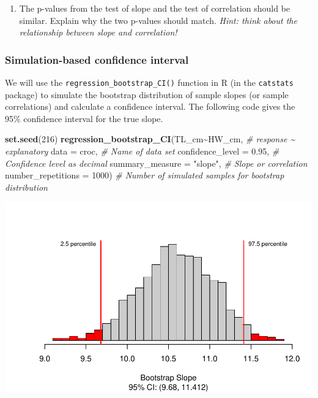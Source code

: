 \documentclass[
]{report}
\newenvironment{Shaded}{\begin{snugshade}}{\end{snugshade}}
\newcommand{\AttributeTok}[1]{\textcolor[rgb]{0.13,0.29,0.53}{#1}}
\newcommand{\CommentTok}[1]{\textcolor[rgb]{0.56,0.35,0.01}{\textit{#1}}}
\newcommand{\DecValTok}[1]{\textcolor[rgb]{0.00,0.00,0.81}{#1}}
\newcommand{\FloatTok}[1]{\textcolor[rgb]{0.00,0.00,0.81}{#1}}
\newcommand{\FunctionTok}[1]{\textcolor[rgb]{0.13,0.29,0.53}{\textbf{#1}}}
\newcommand{\NormalTok}[1]{#1}
\newcommand{\SpecialCharTok}[1]{\textcolor[rgb]{0.81,0.36,0.00}{\textbf{#1}}}
\newcommand{\StringTok}[1]{\textcolor[rgb]{0.31,0.60,0.02}{#1}}
\providecommand{\tightlist}{%
  \setlength{\itemsep}{0pt}\setlength{\parskip}{0pt}}
\begin{document}
\begin{enumerate}
\def\labelenumi{\arabic{enumi}.}
\setcounter{enumi}{10}
\tightlist
\item
  The p-values from the test of slope and the test of correlation should be similar. Explain why the two p-values should match. \emph{Hint: think about the relationship between slope and correlation!}
\end{enumerate}

\vspace{1in}

\hypertarget{simulation-based-confidence-interval}{%
\subsubsection*{Simulation-based confidence interval}\label{simulation-based-confidence-interval}}

We will use the \texttt{regression\_bootstrap\_CI()} function in R (in the \texttt{catstats} package) to simulate the bootstrap distribution of sample slopes (or sample correlations) and calculate a confidence interval. The following code gives the 95\% confidence interval for the true slope.

\begin{Shaded}
\begin{Highlighting}[]
\FunctionTok{set.seed}\NormalTok{(}\DecValTok{216}\NormalTok{)}
\FunctionTok{regression\_bootstrap\_CI}\NormalTok{(TL\_cm}\SpecialCharTok{\textasciitilde{}}\NormalTok{HW\_cm, }\CommentTok{\# response \textasciitilde{} explanatory}
   \AttributeTok{data =}\NormalTok{ croc, }\CommentTok{\# Name of data set}
   \AttributeTok{confidence\_level =} \FloatTok{0.95}\NormalTok{, }\CommentTok{\# Confidence level as decimal}
   \AttributeTok{summary\_measure =} \StringTok{"slope"}\NormalTok{, }\CommentTok{\# Slope or correlation}
   \AttributeTok{number\_repetitions =} \DecValTok{1000}\NormalTok{) }\CommentTok{\# Number of simulated samples for bootstrap distribution}
\end{Highlighting}
\end{Shaded}

\begin{center}\includegraphics[width=0.7\linewidth]{13-OCA10-regression-simulation_files/figure-latex/unnamed-chunk-7-1} \end{center}
\end{document}

